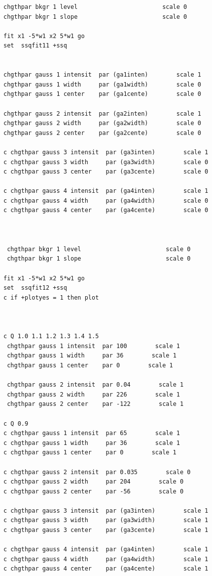 \documentclass[11pt,fleqn]{book} %
\begin{document}
\begin{verbatim}
chgthpar bkgr 1 level                        scale 0
chgthpar bkgr 1 slope                        scale 0

fit x1 -5*w1 x2 5*w1 go
set  ssqfit11 +ssq


chgthpar gauss 1 intensit  par (ga1inten)        scale 1
chgthpar gauss 1 width     par (ga1width)        scale 0
chgthpar gauss 1 center    par (ga1cente)        scale 0

chgthpar gauss 2 intensit  par (ga2inten)        scale 1
chgthpar gauss 2 width     par (ga2width)        scale 0
chgthpar gauss 2 center    par (ga2cente)        scale 0

c chgthpar gauss 3 intensit  par (ga3inten)        scale 1
c chgthpar gauss 3 width     par (ga3width)        scale 0
c chgthpar gauss 3 center    par (ga3cente)        scale 0

c chgthpar gauss 4 intensit  par (ga4inten)        scale 1
c chgthpar gauss 4 width     par (ga4width)        scale 0
c chgthpar gauss 4 center    par (ga4cente)        scale 0
 


 chgthpar bkgr 1 level                        scale 0
 chgthpar bkgr 1 slope                        scale 0

fit x1 -5*w1 x2 5*w1 go
set  ssqfit12 +ssq
c if +plotyes = 1 then plot



c Q 1.0 1.1 1.2 1.3 1.4 1.5
 chgthpar gauss 1 intensit  par 100        scale 1
 chgthpar gauss 1 width     par 36        scale 1
 chgthpar gauss 1 center    par 0        scale 1

 chgthpar gauss 2 intensit  par 0.04        scale 1
 chgthpar gauss 2 width     par 226        scale 1
 chgthpar gauss 2 center    par -122        scale 1

c Q 0.9
c chgthpar gauss 1 intensit  par 65        scale 1
c chgthpar gauss 1 width     par 36        scale 1
c chgthpar gauss 1 center    par 0        scale 1

c chgthpar gauss 2 intensit  par 0.035        scale 0
c chgthpar gauss 2 width     par 204        scale 0
c chgthpar gauss 2 center    par -56        scale 0

c chgthpar gauss 3 intensit  par (ga3inten)        scale 1
c chgthpar gauss 3 width     par (ga3width)        scale 1
c chgthpar gauss 3 center    par (ga3cente)        scale 1

c chgthpar gauss 4 intensit  par (ga4inten)        scale 1
c chgthpar gauss 4 width     par (ga4width)        scale 1
c chgthpar gauss 4 center    par (ga4cente)        scale 1


\end{verbatim}
\end{document}
